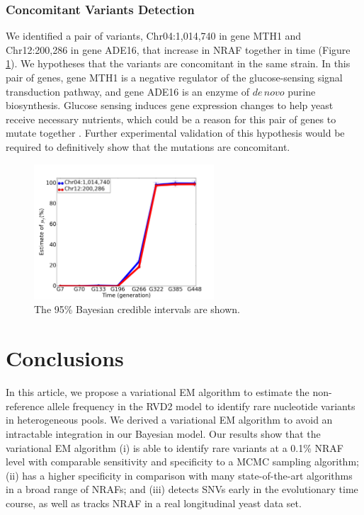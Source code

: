 \documentclass{bmcart}
\begin{document}
\subsubsection{Concomitant Variants Detection}
We identified a pair of variants, Chr04:1,014,740 in gene MTH1 and Chr12:200,286 in gene ADE16, that increase in NRAF together in time (Figure \ref{figure:concomitant}).
We hypotheses that the variants are concomitant in the same strain.
In this pair of genes, gene MTH1 is a negative regulator of the glucose-sensing signal transduction pathway, and gene ADE16 is an enzyme of $\mathit{de\, novo}$ purine biosynthesis.
Glucose sensing induces gene expression changes to help yeast receive necessary nutrients, which could be a reason for this pair of genes to mutate together \cite{johnston1999feasting}.
Further experimental validation of this hypothesis would be required to definitively show that the mutations are concomitant.
\begin{figure}[htbp]
\centering
\includegraphics[width=0.6\textwidth]{concomitant.png}
\caption{
The 95\% Bayesian credible intervals are shown.}
\label{figure:concomitant}
\end{figure}



\section{Conclusions}
In this article, we propose a variational EM algorithm to estimate the non-reference allele frequency in the RVD2 model to identify rare nucleotide variants in heterogeneous pools.
We derived a variational EM algorithm to avoid an intractable integration in our Bayesian model.
Our results show that the variational EM algorithm
(i) is able to identify rare variants at a 0.1\% NRAF level with comparable sensitivity and specificity to a MCMC sampling algorithm;
(ii) has a higher specificity in comparison with many state-of-the-art algorithms in a broad range of NRAFs;
and (iii) detects SNVs early in the evolutionary time course, as well as tracks NRAF in a real longitudinal yeast data set.
\end{document}
